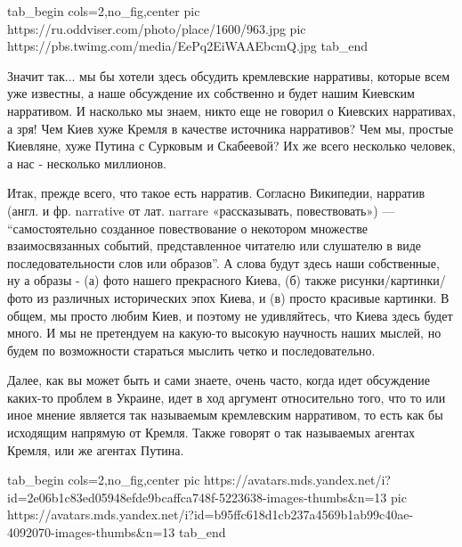 \ifcmt
  tab_begin cols=2,no_fig,center
     pic https://ru.oddviser.com/photo/place/1600/963.jpg
		 pic https://pbs.twimg.com/media/EePq2EiWAAEbcmQ.jpg
  tab_end
\fi

Значит так... мы бы хотели здесь обсудить кремлевские нарративы, которые всем
уже известны, а наше обсуждение их собственно и будет нашим Киевским
нарративом.  И насколько мы знаем, никто еще не говорил о Киевских нарративах,
а зря! Чем Киев хуже Кремля в качестве источника нарративов? Чем мы, простые
Киевляне, хуже Путина с Сурковым и Скабеевой? Их же всего несколько человек, а
нас - несколько миллионов.

Итак, прежде всего, что такое есть нарратив. Согласно Википедии, нарратив
(англ. и фр. narrative от лат. narrare «рассказывать, повествовать») —
\enquote{самостоятельно созданное повествование о некотором множестве
взаимосвязанных событий, представленное читателю или слушателю в виде
последовательности слов или образов}. А слова будут здесь наши собственные, ну
а образы - (а) фото нашего прекрасного Киева, (б) также рисунки/картинки/фото
из различных исторических эпох Киева, и (в) просто красивые картинки. В общем,
мы просто любим Киев, и поэтому не удивляйтесь, что Киева здесь будет много. И
мы не претендуем на какую-то высокую научность наших мыслей, но будем по
возможности стараться мыслить четко и последовательно.

Далее, как вы может быть и сами знаете, очень часто, когда идет обсуждение
каких-то проблем в Украине, идет в ход аргумент относительно того, что то или
иное мнение является так называемым кремлевским нарративом, то есть как бы
исходящим напрямую от Кремля. Также говорят о так называемых агентах Кремля,
или же агентах Путина.

\ifcmt
  tab_begin cols=2,no_fig,center
     pic https://avatars.mds.yandex.net/i?id=2e06b1c83ed05948efde9bcaffca748f-5223638-images-thumbs&n=13
		 pic https://avatars.mds.yandex.net/i?id=b95ffc618d1cb237a4569b1ab99c40ae-4092070-images-thumbs&n=13
  tab_end
\fi

